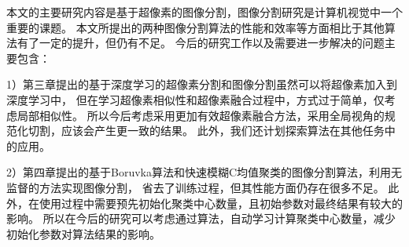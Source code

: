 本文的主要研究内容是基于超像素的图像分割，图像分割研究是计算机视觉中一个重要的课题。
本文所提出的两种图像分割算法的性能和效率等方面相比于其他算法有了一定的提升，但仍有不足。
今后的研究工作以及需要进一步解决的问题主要包含：

1）第三章提出的基于深度学习的超像素分割和图像分割虽然可以将超像素加入到深度学习中，
但在学习超像素相似性和超像素融合过程中，方式过于简单，仅考虑局部相似性。
所以今后考虑采用更加有效超像素融合方法，采用全局视角的规范化切割，应该会产生更一致的结果。
此外，我们还计划探索算法在其他任务中的应用。

2）第四章提出的基于Boruvka算法和快速模糊C均值聚类的图像分割算法，利用无监督的方法实现图像分割，
省去了训练过程，但其性能方面仍存在很多不足。
此外，在使用过程中需要预先初始化聚类中心数量，且初始参数对最终结果有较大的影响。
所以在今后的研究可以考虑通过算法，自动学习计算聚类中心数量，减少初始化参数对算法结果的影响。



